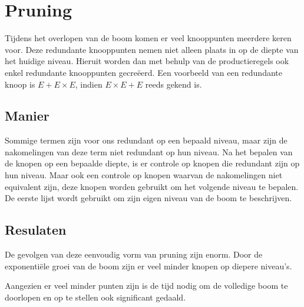 \documentclass[Main.tex]{subfiles}
\begin{document}
\section{Pruning}

Tijdens het overlopen van de boom komen er veel knooppunten meerdere keren voor. Deze redundante knooppunten nemen niet alleen plaats in op de diepte van het huidige niveau. Hieruit worden dan met behulp van de productieregels ook enkel redundante knooppunten gecre\"eerd. Een voorbeeld van een redundante knoop is $E + E \times E$, indien $E \times E + E$ reeds gekend is.

\subsection{Manier}
Sommige termen zijn voor ons redundant op een bepaald niveau, maar zijn de nakomelingen van deze term niet redundant op hun niveau. Na het bepalen van de knopen op een bepaalde diepte, is er controle op knopen die redundant zijn op hun niveau. Maar ook een controle op knopen waarvan de nakomelingen niet equivalent zijn, deze knopen worden gebruikt om het volgende niveau te bepalen. De eerste lijst wordt gebruikt om zijn eigen niveau van de boom te beschrijven.



\subsection{Resulaten}

De gevolgen van deze eenvoudig vorm van pruning zijn enorm. Door de exponenti\"ele groei van de boom zijn er veel minder knopen op diepere niveau's. %

Aangezien er veel minder punten zijn is de tijd nodig om de volledige boom te doorlopen en op te stellen ook significant gedaald. 
\end{document}
